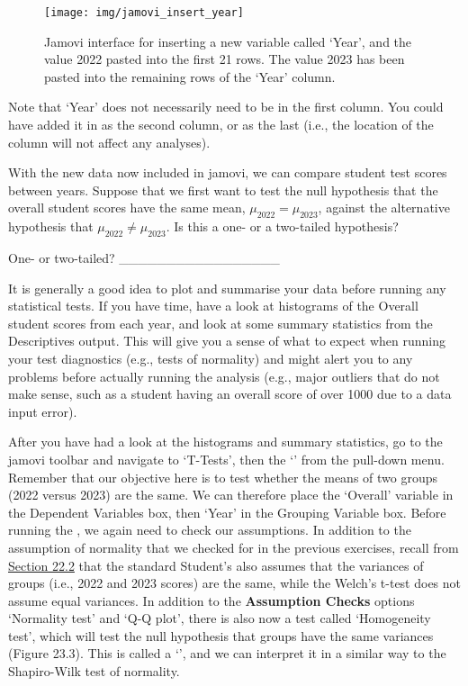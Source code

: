 \documentclass[
  openany]{krantz}
\begin{document}
\begin{figure}
\texttt{[image: img/jamovi\_insert\_year]} \caption{Jamovi interface for inserting a new variable called `Year', and the value 2022 pasted into the first 21 rows. The value 2023 has been pasted into the remaining rows of the `Year' column.}\label{fig:unnamed-chunk-91}
\end{figure}

Note that `Year' does not necessarily need to be in the first column.
You could have added it in as the second column, or as the last (i.e., the location of the column will not affect any analyses).

With the new data now included in jamovi, we can compare student test scores between years.
Suppose that we first want to test the null hypothesis that the overall student scores have the same mean, \(\mu_{2022} = \mu_{2023}\), against the alternative hypothesis that \(\mu_{2022} \neq \mu_{2023}\).
Is this a one- or a two-tailed hypothesis?

One- or two-tailed? \_\_\_\_\_\_\_\_\_\_\_\_\_\_\_\_\_

It is generally a good idea to plot and summarise your data before running any statistical tests.
If you have time, have a look at histograms of the Overall student scores from each year, and look at some summary statistics from the Descriptives output.
This will give you a sense of what to expect when running your test diagnostics (e.g., tests of normality) and might alert you to any problems before actually running the analysis (e.g., major outliers that do not make sense, such as a student having an overall score of over 1000 due to a data input error).

After you have had a look at the histograms and summary statistics, go to the jamovi toolbar and navigate to `T-Tests', then the `' from the pull-down menu.
Remember that our objective here is to test whether the means of two groups (2022 versus 2023) are the same.
We can therefore place the `Overall' variable in the Dependent Variables box, then `Year' in the Grouping Variable box.
Before running the , we again need to check our assumptions.
In addition to the assumption of normality that we checked for in the previous exercises, recall from \protect\hyperlink{independent-samples-t-test}{Section 22.2} that the standard Student's  also assumes that the variances of groups (i.e., 2022 and 2023 scores) are the same, while the Welch's t-test does not assume equal variances.
In addition to the \textbf{Assumption Checks} options `Normality test' and `Q-Q plot', there is also now a test called `Homogeneity test', which will test the null hypothesis that groups have the same variances (Figure 23.3).
This is called a `', and we can interpret it in a similar way to the Shapiro-Wilk test of normality.
\end{document}
